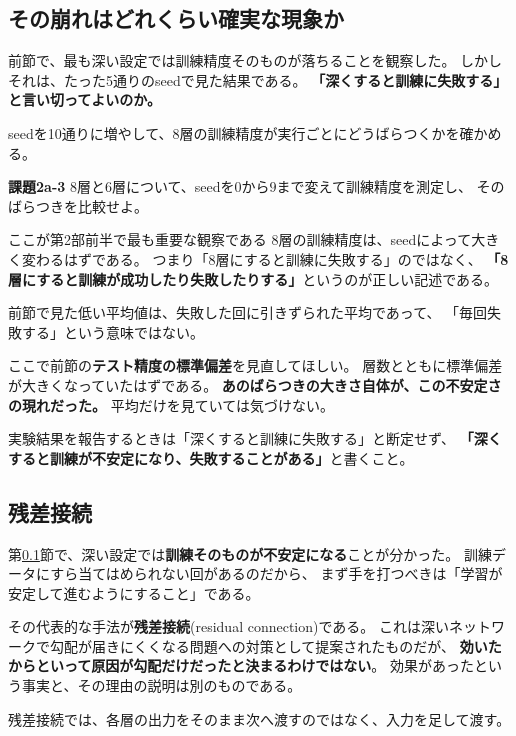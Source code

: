 \documentclass[11pt,a4paper]{jsarticle}
\begin{document}
\subsection{その崩れはどれくらい確実な現象か}\label{sec:seedcheck}

前節で、最も深い設定では訓練精度そのものが落ちることを観察した。
しかしそれは、たった5通りのseedで見た結果である。
\textbf{「深くすると訓練に失敗する」と言い切ってよいのか。}

seedを10通りに増やして、8層の訓練精度が実行ごとにどうばらつくかを確かめる。

\begin{screen}
\textbf{課題2a-3} \quad 8層と6層について、seedを$0$から$9$まで変えて訓練精度を測定し、
そのばらつきを比較せよ。
\end{screen}

\begin{itembox}[l]{ここが第2部前半で最も重要な観察である}
8層の訓練精度は、seedによって大きく変わるはずである。
つまり「8層にすると訓練に失敗する」のではなく、
\textbf{「8層にすると訓練が成功したり失敗したりする」}というのが正しい記述である。

前節で見た低い平均値は、失敗した回に引きずられた平均であって、
「毎回失敗する」という意味ではない。

ここで前節の\textbf{テスト精度の標準偏差}を見直してほしい。
層数とともに標準偏差が大きくなっていたはずである。
\textbf{あのばらつきの大きさ自体が、この不安定さの現れだった。}
平均だけを見ていては気づけない。

実験結果を報告するときは「深くすると訓練に失敗する」と断定せず、
\textbf{「深くすると訓練が不安定になり、失敗することがある」}と書くこと。
\end{itembox}

\subsection{残差接続}

第\ref{sec:seedcheck}節で、深い設定では\textbf{訓練そのものが不安定になる}ことが分かった。
訓練データにすら当てはめられない回があるのだから、
まず手を打つべきは「学習が安定して進むようにすること」である。

その代表的な手法が\textbf{残差接続}(residual connection)である。
これは深いネットワークで勾配が届きにくくなる問題への対策として提案されたものだが、
\textbf{効いたからといって原因が勾配だけだったと決まるわけではない}。
効果があったという事実と、その理由の説明は別のものである。

残差接続では、各層の出力をそのまま次へ渡すのではなく、入力を足して渡す。
\end{document}
